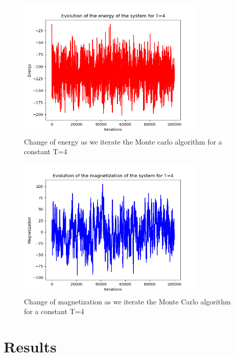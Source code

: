 \documentclass[aps,twocolumn,twoside,secnumarabic,balancelastpage,amsmath,amssymb,nofootinbib,hyperref=pdftex]{revtex4}
\begin{document}
\begin{figure}[htb]
\includegraphics[width=9cm]{E_iteration4.png}	
\caption{Change of energy as we iterate the Monte carlo algorithm for a constant T=4}
\end{figure}
\begin{figure}[htb]
\includegraphics[width=9cm]{M_iteration4.png}	
\caption{Change of magnetization as we iterate the Monte Carlo algorithm for a constant T=4}
\end{figure}



\section{Results}
\end{document}
